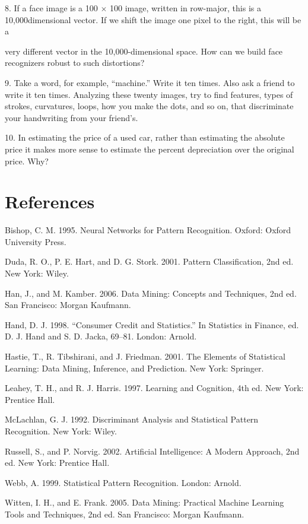 8. If a face image is a 100 $\times$ 100 image, written in row-major, this is a 10,000dimensional vector. If we shift the image one pixel to the right, this will be a

very different vector in the 10,000-dimensional space. How can we build face recognizers robust to such distortions?

9. Take a word, for example, “machine.” Write it ten times. Also ask a friend to write it ten times. Analyzing these twenty images, try to find features, types of strokes, curvatures, loops, how you make the dots, and so on, that discriminate your handwriting from your friend’s.

10. In estimating the price of a used car, rather than estimating the absolute price it makes more sense to estimate the percent depreciation over the original price. Why?

\section{References}

Bishop, C. M. 1995. Neural Networks for Pattern Recognition. Oxford: Oxford University Press.

Duda, R. O., P. E. Hart, and D. G. Stork. 2001. Pattern Classification, 2nd ed. New York: Wiley.

Han, J., and M. Kamber. 2006. Data Mining: Concepts and Techniques, 2nd ed. San Francisco: Morgan Kaufmann.

Hand, D. J. 1998. “Consumer Credit and Statistics.” In Statistics in Finance, ed. D. J. Hand and S. D. Jacka, 69--81. London: Arnold.

Hastie, T., R. Tibshirani, and J. Friedman. 2001. The Elements of Statistical Learning: Data Mining, Inference, and Prediction. New York: Springer.

Leahey, T. H., and R. J. Harris. 1997. Learning and Cognition, 4th ed. New York: Prentice Hall.

McLachlan, G. J. 1992. Discriminant Analysis and Statistical Pattern Recognition. New York: Wiley.

Russell, S., and P. Norvig. 2002. Artificial Intelligence: A Modern Approach, 2nd ed. New York: Prentice Hall.

Webb, A. 1999. Statistical Pattern Recognition. London: Arnold.

Witten, I. H., and E. Frank. 2005. Data Mining: Practical Machine Learning Tools and Techniques, 2nd ed. San Francisco: Morgan Kaufmann.
